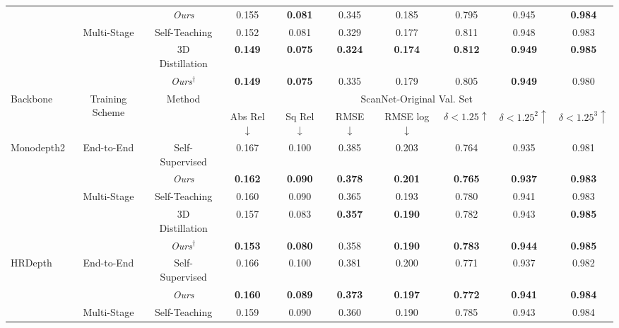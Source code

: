 \begin{table}[ht]
{\begin{tabular}{@{}l|c|c|ccccccc@{}}
    & & \textit{Ours} & 0.155 & \textbf{0.081} & 0.345 & 0.185 & 0.795 & 0.945 & \textbf{0.984} \\
    \cmidrule{2-10}
    & \multirow{3}{*}{Multi-Stage} & Self-Teaching & 0.152 & 0.081 & 0.329 & 0.177 & 0.811 & 0.948 & 0.983 \\
    & & 3D Distillation & \textbf{0.149} & \textbf{0.075} & \textbf{0.324} & \textbf{0.174} & \textbf{0.812} & \textbf{0.949} & \textbf{0.985} \\
    & & \textit{Ours}$^{\dagger}$ & \textbf{0.149} & \textbf{0.075} & 0.335 & 0.179 & 0.805 & \textbf{0.949} & 0.980 \\
  \bottomrule
  \toprule
    \multirow{2}{*}{Backbone} & \multirow{2}{*}{Training Scheme} & \multirow{2}{*}{Method} & \multicolumn{7}{c}{ScanNet-Original Val. Set} \\
    & & & Abs Rel $\downarrow$ & Sq Rel $\downarrow$ & RMSE $\downarrow$ & RMSE log $\downarrow$ & $\delta < 1.25 \uparrow$ & $\delta < 1.25^2 \uparrow$ & $\delta < 1.25^3 \uparrow$ \\
    \midrule
    \multirow{5}{*}{Monodepth2} & \multirow{2}{*}{End-to-End} & Self-Supervised & 0.167 & 0.100 & 0.385 & 0.203 & 0.764 & 0.935 & 0.981 \\
    & & \textit{Ours} & \textbf{0.162} & \textbf{0.090} & \textbf{0.378} & \textbf{0.201} & \textbf{0.765} & \textbf{0.937} & \textbf{0.983} \\
    \cmidrule{2-10}
    & \multirow{3}{*}{Multi-Stage}
    & Self-Teaching & 0.160 & 0.090 & 0.365 & 0.193 & 0.780 & 0.941 & 0.983 \\
    & & 3D Distillation & 0.157 & 0.083 & \textbf{0.357} & \textbf{0.190} & 0.782 & 0.943 & \textbf{0.985} \\
    & & \textit{Ours}$^{\dagger}$ & \textbf{0.153} & \textbf{0.080} & 0.358 & \textbf{0.190} & \textbf{0.783} & \textbf{0.944} & \textbf{0.985} \\
    \midrule
    \multirow{5}{*}{HRDepth} & \multirow{2}{*}{End-to-End} & Self-Supervised & 0.166 & 0.100 & 0.381 & 0.200 & 0.771 & 0.937 & 0.982 \\
    & & \textit{Ours} & \textbf{0.160} & \textbf{0.089} & \textbf{0.373} & \textbf{0.197} & \textbf{0.772} & \textbf{0.941} & \textbf{0.984} \\
    \cmidrule{2-10}
    & \multirow{3}{*}{Multi-Stage} & Self-Teaching & 0.159 & 0.090 & 0.360 & 0.190 & 0.785 & 0.943 & 0.984 \\

\end{tabular}}
\end{table}
